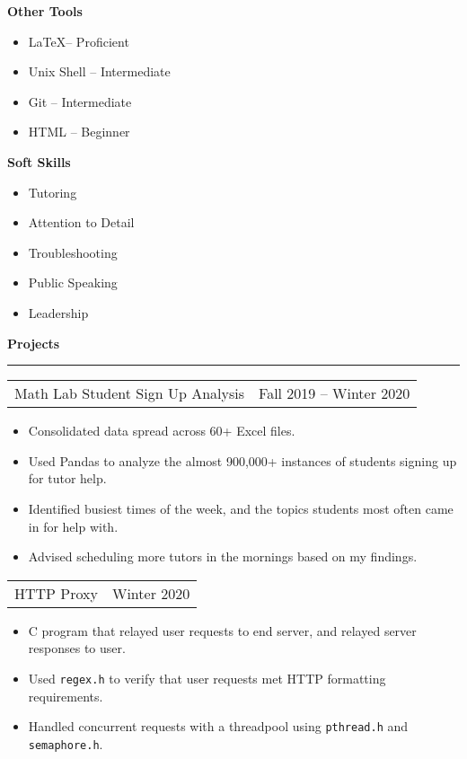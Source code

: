 \documentclass{article}
\newenvironment{compactItemize}{
  \begin{itemize}[itemsep=0ex, parsep=0ex, partopsep=0ex, topsep= -7pt]
}{
  \end{itemize}
}
\newcommand{\project}[2]{
  \begingroup
  \setlength{\tabcolsep}{0ex}
  \begin{tabularx}{\linewidth}{X r}
    #1 & %
    #2\\ %
  \end{tabularx}%
  \endgroup%
}
\begin{document}
\textbf{Other Tools}
\begin{multicols}{2}
  \begin{compactItemize}
    \item \LaTeX -- Proficient
    \item Unix Shell -- Intermediate
    \item Git -- Intermediate
    \item HTML -- Beginner
  \end{compactItemize}
\end{multicols}

\textbf{Soft Skills}
\begin{multicols}{2}
  \begin{compactItemize}
    \item Tutoring
    \item Attention to Detail
    \item Troubleshooting 
    \item Public Speaking 
    \item Leadership
  \end{compactItemize}
\end{multicols}
\smallskip

\textbf{Projects %
}
\smallskip
\hrule

\project{Math Lab Student Sign Up Analysis}{Fall 2019 -- Winter 2020}
\begin{compactItemize}
  \item Consolidated data spread across 60+ Excel files.
  \item Used Pandas to analyze the almost 900,000+ instances of students signing up for tutor help.
  \item Identified busiest times of the week, and the topics students most often came in for help with.
  \item Advised scheduling more tutors in the mornings based on my findings.
\end{compactItemize}
\medskip

\project{HTTP Proxy}{Winter 2020}
\begin{compactItemize}
  \item C program that relayed user requests to end server, and relayed server responses to user.
  \item Used \texttt{regex.h} to verify that user requests met HTTP formatting requirements.
  \item Handled concurrent requests with a threadpool using \texttt{pthread.h} and \texttt{semaphore.h}.
\end{compactItemize}
\medskip
\end{document}
